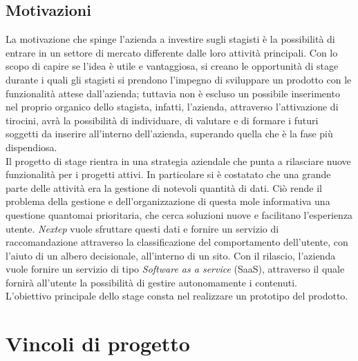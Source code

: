 \subsection{Motivazioni}
La motivazione che spinge l'azienda a investire sugli stagisti è la possibilità di entrare in un settore di mercato differente dalle loro attività principali. Con lo scopo di capire se l'idea è utile e vantaggiosa, si creano le opportunità di stage durante i quali gli stagisti si prendono l'impegno di sviluppare un prodotto con le funzionalità attese dall'azienda; tuttavia non è escluso un possibile inserimento nel proprio organico dello stagista, infatti, l'azienda, attraverso l'attivazione di tirocini, avrà la possibilità di individuare, di valutare e di formare i futuri soggetti da inserire all'interno dell'azienda, superando quella che è la fase più dispendiosa.\\
Il progetto di stage rientra in una strategia aziendale che punta a rilasciare nuove funzionalità per i progetti attivi. In particolare si è costatato che una grande parte delle attività era la gestione di notevoli quantità di dati. Ciò rende il problema della gestione e dell'organizzazione di questa mole informativa una questione quantomai prioritaria, che cerca soluzioni nuove e facilitano l'esperienza utente. \textit{Nextep} vuole sfruttare questi dati e fornire un servizio di raccomandazione attraverso la classificazione del comportamento dell'utente, con l'aiuto di un albero decisionale, all'interno di un sito. Con il rilascio, l'azienda vuole fornire un servizio di tipo \textit{Software as a service} (SaaS), attraverso il quale fornirà all'utente la possibilità di gestire autonomamente i contenuti.\\
L'obiettivo principale dello stage consta nel realizzare un prototipo del prodotto.

\section{Vincoli di progetto}

